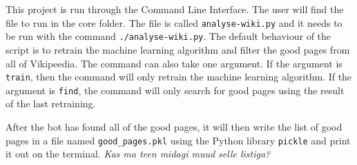 This project is run through the Command Line Interface. The user will find the
file to run in the core folder. The file is called \verb;analyse-wiki.py; and it
needs to be run with the command \verb;./analyse-wiki.py;. The default behaviour
of the script is to retrain the machine learning algorithm and filter the good
pages from all of Vikipeedia. The command can also take one argument. If the
argument is \verb;train;, then the command will only retrain the machine
learning algorithm. If the argument is \verb;find;, the command will only search
for good pages using the result of the last retraining. 

After the bot has found all of the good pages, it will then write the list of
good pages in a file named \verb;good_pages.pkl; using the Python library
\verb;pickle; and print it out on the terminal. \emph{Kas ma teen midagi muud
selle listiga?}